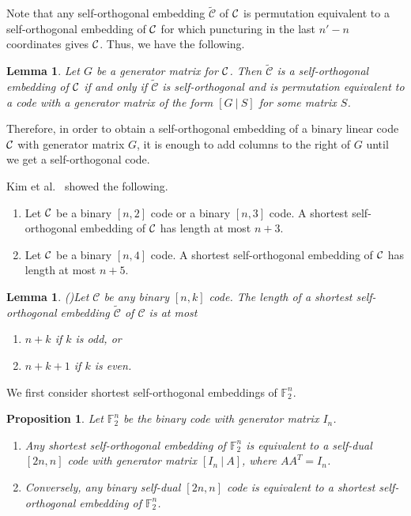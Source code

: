 \documentclass{article}
\newtheorem{lemma}[theorem]{Lemma}
\newtheorem{prop}[theorem]{Proposition}
\theoremstyle{definition}
\theoremstyle{remark}
\newcommand{\C}{\mbox{$\cal C$}}
\begin{document}
Note that any self-orthogonal embedding $\tilde{\mathcal{C}}$ of $\C$ is permutation equivalent to a self-orthogonal embedding of $\C$ for which puncturing in the last $n'-n$ coordinates gives $\C$. Thus, we have the following.

\begin{lemma}
Let $G$ be a generator matrix for $\C$. Then $\tilde{\mathcal{C}}$ is a self-orthogonal embedding of $\C$ if and only if $\tilde{\mathcal{C}}$ is self-orthogonal and is permutation equivalent to a code with a generator matrix of the form $[G~|~S]$ for some matrix $S$.
\end{lemma}

Therefore, in order to obtain a self-orthogonal embedding of a binary linear code $\C$ with generator matrix $G$, it is enough to add columns to the right of $G$ until we get a self-orthogonal code.

Kim et al.~\cite{Kim2021} showed the following.
\begin{enumerate}
 	\item[{(i)}] Let $\C$ be a binary $[n,2]$ code or a binary $[n,3]$ code.  A shortest self-orthogonal embedding of $\C$ has length at most $n+3$.
	\item[{(ii)}] Let $\C$ be a binary $[n,4]$ code.  A shortest self-orthogonal embedding of $\C$ has length at most $n+5$.
\end{enumerate}

\begin{lemma}{\rm(\cite[Theorem 13]{Kim2022})}\label{lem-Kim2022Thm}
 Let  $\mathcal C$ be any binary $[n, k]$ code.  The length of a shortest self-orthogonal embedding $\tilde{\mathcal{C}}$ of $\mathcal{C}$ is at most
\begin{enumerate}
  \item[{(i)}] $n+k$ if $k$ is odd, or
  \item[{(ii)}] $n+k+1$  if $k$ is even.
\end{enumerate}
\end{lemma}

We first consider shortest self-orthogonal embeddings of $\mathbb F_2^n$.
\begin{prop}
 Let $\mathbb F_2^n$ be the binary code with generator matrix $I_n$.
 \begin{enumerate}
 \item[{(i)}]
 Any shortest self-orthogonal embedding of $\mathbb F_2^n$ is equivalent to a self-dual $[2n, n]$ code with generator matrix $[I_n~|~A]$, where $AA^T=I_n$.

  \item[{(ii)}]
  Conversely, any binary self-dual $[2n, n]$ code is equivalent to a shortest self-orthogonal embedding of $\mathbb F_2^n$.
\end{enumerate}

\end{prop}
\end{document}
